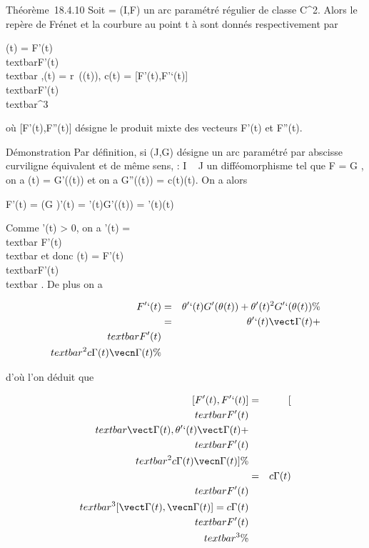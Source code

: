 Théorème~18.4.10 Soit \Gamma = (I,F) un arc paramétré régulier de classe
C^2. Alors le repère de Frénet et la courbure au point t à \Gamma
sont donnés respectivement par

\vect\Gamma(t) = F'(t) \over
\\textbar{}F'(t)\\textbar{}
,\quad \vecn\Gamma(t) =
r\pi~(\vect\Gamma(t)),\quad
c\Gamma(t) = {[}F'(t),F'`(t){]} \over
\\textbar{}F'(t)\\textbar{}^3

où {[}F'(t),F''(t){]} désigne le produit mixte des vecteurs F'(t) et
F''(t).

Démonstration Par définition, si (J,G) désigne un arc paramétré par
abscisse curviligne équivalent et de même sens, \theta : I \rightarrow~ J un
difféomorphisme tel que F = G \cdot \theta, on a
\vect\Gamma(t) = G'(\theta(t)) et on a G''(\theta(t)) =
c\Gamma(t)\vecn\Gamma(t). On a alors

F'(t) = (G \cdot \theta)'(t) = \theta'(t)G'(\theta(t)) =
\theta'(t)\vect\Gamma(t)

Comme \theta'(t) \textgreater{} 0, on a \theta'(t) =\\textbar{}
F'(t)\\textbar{} et donc
\vect\Gamma(t) = F'(t) \over
\\textbar{}F'(t)\\textbar{} . De plus on
a

\begin{align*} F'`(t)& =& \theta'`(t)G'(\theta(t)) +
\theta'(t)^2G'`(\theta(t)) \%& \\ & =&
\theta'`(t)\vect\Gamma(t) +\\textbar{}
F'(t)\\textbar{}^2c
\Gamma(t)\vecn\Gamma(t)\%&
\\ \end{align*}

d'où l'on déduit que

\begin{align*} {[}F'(t),F'`(t){]}& =&
{[}\\textbar{}F'(t)\\textbar{}\vect\Gamma(t),\theta'`(t)\vect\Gamma(t)
+\\textbar{}
F'(t)\\textbar{}^2c
\Gamma(t)\vecn\Gamma(t){]}\%&
\\ & =&
c\Gamma(t)\\textbar{}F'(t)\\textbar{}^3{[}\vect
\Gamma(t),\vecn\Gamma(t){]} =
c\Gamma(t)\\textbar{}F'(t)\\textbar{}^3
\%& \\ \end{align*}

